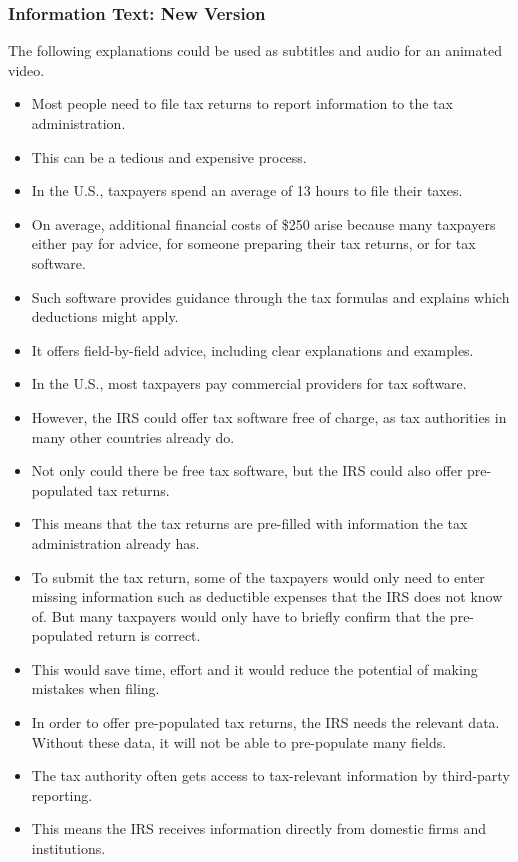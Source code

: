 \documentclass[11pt]{article}
\begin{document}
\subsubsection*{Information Text: New Version}
The following explanations could be used as subtitles and audio for an animated video.
\begin{itemize}
    \item Most people need to file tax returns to report information to the tax administration. 
    \item This can be a tedious and expensive process.
    \item In the U.S., taxpayers spend an average of 13 hours to file their taxes.
    \item On average, additional financial costs of \$250 arise because many taxpayers either pay for advice, for someone preparing their tax returns, or for tax software. 
    \item Such software provides guidance through the tax formulas and explains which deductions might apply.
    \item It offers field-by-field advice, including clear explanations and examples. 
    \item In the U.S., most taxpayers pay commercial providers for tax software.
    \item However, the IRS could offer tax software free of charge, as tax authorities in many other countries already do.
    \item Not only could there be free tax software, but the IRS could also offer pre-populated tax returns. 
    \item This means that the tax returns are pre-filled with information the tax administration already has.
    \item To submit the tax return, some of the taxpayers would only need to enter missing information such as deductible expenses that the IRS does not know of. But many taxpayers would only have to briefly confirm that the pre-populated return is correct.
    \item This would save time, effort and it would reduce the potential of making mistakes when filing. 
    \item In order to offer pre-populated tax returns, the IRS needs the relevant data. Without these data, it will not be able to pre-populate many fields. 
    \item The tax authority often gets access to tax-relevant information by third-party reporting. 
    \item This means the IRS receives information directly from domestic firms and institutions. 

\end{itemize}
\end{document}
